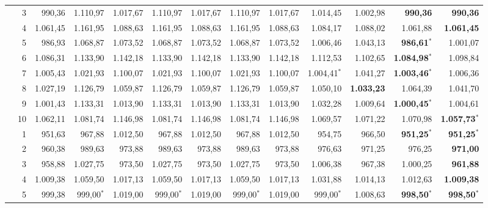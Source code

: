 \documentclass[11pt,a4paper]{article}
\begin{document}
\begin{table}[!htbp]
{\begin{tabular}{rrr rr rr rr rr rr}
 & 3 & 990{,}36 & 1.110{,}97 & 1.017{,}67 & 1.110{,}97 & 1.017{,}67 & 1.110{,}97 & 1.017{,}67 & 1.014{,}45 & 1.002{,}98 & \textbf{990{,}36} & \textbf{990{,}36} \\
 & 4 & 1.061{,}45 & 1.161{,}95 & 1.088{,}63 & 1.161{,}95 & 1.088{,}63 & 1.161{,}95 & 1.088{,}63 & 1.084{,}17 & 1.088{,}02 & 1.061{,}88 & \textbf{1.061{,}45} \\
 & 5 & 986{,}93 & 1.068{,}87 & 1.073{,}52 & 1.068{,}87 & 1.073{,}52 & 1.068{,}87 & 1.073{,}52 & 1.006{,}46 & 1.043{,}13 & \textbf{986{,}61}$^{*}$ & 1.001{,}07 \\
 & 6 & 1.086{,}31 & 1.133{,}90 & 1.142{,}18 & 1.133{,}90 & 1.142{,}18 & 1.133{,}90 & 1.142{,}18 & 1.112{,}53 & 1.102{,}65 & \textbf{1.084{,}98}$^{*}$ & 1.098{,}84 \\
 & 7 & 1.005{,}43 & 1.021{,}93 & 1.100{,}07 & 1.021{,}93 & 1.100{,}07 & 1.021{,}93 & 1.100{,}07 & 1.004{,}41$^{*}$ & 1.041{,}27 & \textbf{1.003{,}46}$^{*}$ & 1.006{,}36 \\
 & 8 & 1.027{,}19 & 1.126{,}79 & 1.059{,}87 & 1.126{,}79 & 1.059{,}87 & 1.126{,}79 & 1.059{,}87 & 1.050{,}10 & \textbf{1.033{,}23} & 1.064{,}39 & 1.041{,}70 \\
 & 9 & 1.001{,}43 & 1.133{,}31 & 1.013{,}90 & 1.133{,}31 & 1.013{,}90 & 1.133{,}31 & 1.013{,}90 & 1.032{,}28 & 1.009{,}64 & \textbf{1.000{,}45}$^{*}$ & 1.004{,}61 \\
 & 10 & 1.062{,}11 & 1.081{,}74 & 1.146{,}98 & 1.081{,}74 & 1.146{,}98 & 1.081{,}74 & 1.146{,}98 & 1.069{,}57 & 1.071{,}22 & 1.070{,}98 & \textbf{1.057{,}73}$^{*}$ \\
\addlinespace
80 & 1 & 951{,}63 & 967{,}88 & 1.012{,}50 & 967{,}88 & 1.012{,}50 & 967{,}88 & 1.012{,}50 & 954{,}75 & 966{,}50 & \textbf{951{,}25}$^{*}$ & \textbf{951{,}25}$^{*}$ \\
 & 2 & 960{,}38 & 989{,}63 & 973{,}88 & 989{,}63 & 973{,}88 & 989{,}63 & 973{,}88 & 976{,}63 & 971{,}25 & 976{,}25 & \textbf{971{,}00} \\
 & 3 & 958{,}88 & 1.027{,}75 & 973{,}50 & 1.027{,}75 & 973{,}50 & 1.027{,}75 & 973{,}50 & 1.006{,}38 & 967{,}38 & 1.000{,}25 & \textbf{961{,}88} \\
 & 4 & 1.009{,}38 & 1.059{,}50 & 1.017{,}13 & 1.059{,}50 & 1.017{,}13 & 1.059{,}50 & 1.017{,}13 & 1.031{,}88 & 1.014{,}13 & 1.012{,}63 & \textbf{1.009{,}38} \\
 & 5 & 999{,}38 & 999{,}00$^{*}$ & 1.019{,}00 & 999{,}00$^{*}$ & 1.019{,}00 & 999{,}00$^{*}$ & 1.019{,}00 & 999{,}00$^{*}$ & 1.008{,}63 & \textbf{998{,}50}$^{*}$ & \textbf{998{,}50}$^{*}$ \\

\end{tabular}}
\end{table}
\end{document}
